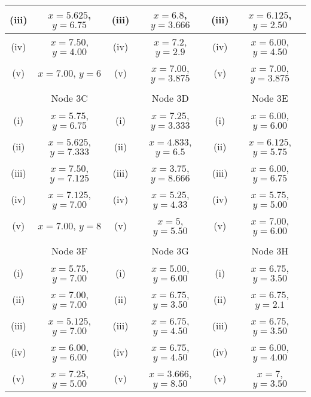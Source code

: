 \documentclass[a4paper,12pt]{article}
\begin{document}
\begin{tabular}{||c|c||c|c||c|c||}
		\hline (iii) & $x= 5.625$, $y= 6.75$  & (iii) & $x= 6.8$, $y =3.666 $ &(iii) & $x= 6.125$, $y= 2.50$ \\  \hline
		\hline (iv)  & $x= 7.50$, $y= 4.00$  & (iv) & $x= 7.2$, $y = 2.9$ & (iv)  & $x= 6.00$, $y= 4.50$\\  \hline
		\hline (v) & $x= 7.00$, $y= 6$ & (v) & $x= 7.00$, $y= 3.875$  &(v) & $x= 7.00$, $y= 3.875$\\  \hline & & & & & \\
		\hline 
		\hline  & Node 3C &   & Node 3D &  & Node 3E  \\  \hline
		\hline (i) & $x= 5.75$, $y= 6.75$ &  (i) & $x= 7.25$, $y = 3.333$  & (i)  & $x= 6.00$, $y= 6.00$\\  \hline
		\hline (ii) & $x= 5.625$, $y= 7.333$  & (ii) & $x= 4.833$, $y =6.5 $ &(ii) & $x= 6.125$, $y= 5.75$ \\  \hline
		\hline (iii)  & $x= 7.50$, $y= 7.125$  & (iii) & $x= 3.75$, $y = 8.666$ & (iii)  & $x= 6.00$, $y= 6.75$\\  \hline
		\hline (iv)  & $x= 7.125$, $y = 7.00$  &  (iv) & $x= 5.25$, $y = 4.33$ & (iv) & $x= 5.75$, $y= 5.00$ \\  \hline
		\hline (v) & $x= 7.00$, $y= 8$ & (v) & $x= 5 $, $y= 5.50$  &(v) & $x= 7.00$, $y= 6.00$\\  \hline & & & & & \\
		\hline 
		\hline  &  Node 3F &  & Node 3G &   & Node 3H \\  \hline
		\hline (i) & $x= 5.75$, $y= 7.00$ & (i) & $x= 5.00$, $y = 6.00$  & (i)  & $x= 6.75$, $y= 3.50$\\  \hline
		\hline (ii)  & $x= 7.00$, $y = 7.00$  & (ii) & $x= 6.75 $, $y= 3.50$ & (ii) & $x= 6.75$, $y = 2.1$ \\  \hline
		\hline (iii) & $x= 5.125$, $y = 7.00 $   & (iii) & $x= 6.75$, $y= 4.50$ &(iii) & $x= 6.75$, $y= 3.50$ \\  \hline
		\hline (iv)  & $x= 6.00$, $y= 6.00$  & (iv) & $x= 6.75$, $y= 4.50$ & (iv)  & $x= 6.00 $, $y = 4.00$\\  \hline
		\hline (v) & $x= 7.25$, $y = 5.00$ & (v)  & $x= 3.666$, $y = 8.50 $ & (v) & $x= 7$, $y= 3.50$\\  \hline
		\hline 
		
	\end{tabular} 
\end{document}
